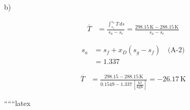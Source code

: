 b)

\[
\begin{aligned}
    \overline{T} &= \frac{\int_{s_e}^{s_a} T \, ds}{s_a - s_e} = \frac{298.15 \, \text{K} - 288.15 \, \text{K}}{s_a - s_e}
\end{aligned}
\]

\[
\begin{aligned}
    s_a &= s_f + x_D (s_g - s_f) \quad \text{(A-2)} \\
    &= 1.337
\end{aligned}
\]

\[
\begin{aligned}
    \overline{T} &= \frac{298.15 - 288.15 \, \text{K}}{0.1549 - 1.337 \, \left[\frac{\text{kJ}}{\text{kgK}}\right]} = -26.17 \, \text{K}
\end{aligned}
\]

``````latex